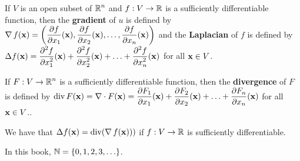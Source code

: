 \begin{defn}
If $V$ is an open subset of $\displaystyle \mathbb{R}^n$ and $f:V \to \mathbb{R}$ is a
sufficiently differentiable function, then the
{\bfseries gradient} of $u$ is defined by
$\displaystyle \operatorname{\nabla} f(\mathbf{x})
= \left( \frac{\partial{f}}{\partial x_1}(\mathbf{x}) , \frac{\partial{f}}{\partial x_2}(\mathbf{x}) ,
\ldots, \frac{\partial{f}}{\partial x_n}(\mathbf{x}) \right)$ and the
{\bfseries Laplacian} of $f$ is defined by
$\displaystyle \Delta f(\mathbf{x})
= \frac{\displaystyle \partial^{2}{f}} {\displaystyle \partial x_1^{2}}(\mathbf{x}) + \frac{\displaystyle \partial^{2}{f}} {\displaystyle \partial x_2^{2}}(\mathbf{x}) +
\ldots + \frac{\displaystyle \partial^{2}{f}} {\displaystyle \partial x_n^{2}}(\mathbf{x})$ for all $\mathbf{x} \in V$.

If $\displaystyle F:V \to \mathbb{R}^n$ is a sufficiently differentiable
function, then the {\bfseries divergence} of $F$ is
defined by $\displaystyle \operatorname{div} F(\mathbf{x}) = \nabla \cdot F(\mathbf{x})
= \frac{\partial{F_1}}{\partial x_1}(\mathbf{x}) + \frac{\partial{F_2}}{\partial x_2}(\mathbf{x}) +
\ldots + \frac{\partial{F_n}}{\partial x_n}(\mathbf{x})$ for all $\mathbf{x} \in V$..
\end{defn}

We have that $\Delta f(\mathbf{x}) = \operatorname{div} (\operatorname{\nabla} f(\mathbf{x})))$
if $f:V \to \mathbb{R}$ is sufficiently differentiable.

 In this book, $\mathbb{N} = \{0,1,2,3, \ldots\}$.

